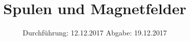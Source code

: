 

\subject{Versuch 308}
\title{Spulen und Magnetfelder}
\date{%
  Durchführung: 12.12.2017
  \hspace{3em}
  Abgabe: 19.12.2017
}



\maketitle
\thispagestyle{empty}
\tableofcontents
\newpage






\printbibliography{}



